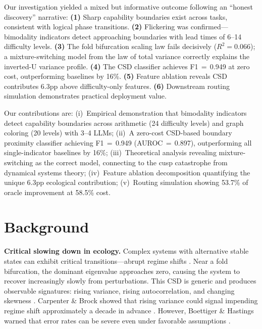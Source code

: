 \documentclass[11pt,letterpaper]{article}
\begin{document}
Our investigation yielded a mixed but informative outcome following an ``honest discovery'' narrative: \textbf{(1)} Sharp capability boundaries exist across tasks, consistent with logical phase transitions. \textbf{(2)} Flickering was confirmed---bimodality indicators detect approaching boundaries with lead times of 6--14 difficulty levels. \textbf{(3)} The fold bifurcation scaling law fails decisively ($R^2{=}0.066$); a mixture-switching model from the law of total variance correctly explains the inverted-U variance profile. \textbf{(4)} The CSD classifier achieves F1$\,{=}\,$0.949 at zero cost, outperforming baselines by 16\%. \textbf{(5)} Feature ablation reveals CSD contributes 6.3pp above difficulty-only features. \textbf{(6)} Downstream routing simulation demonstrates practical deployment value.

Our contributions are: (i)~Empirical demonstration that bimodality indicators detect capability boundaries across arithmetic (24 difficulty levels) and graph coloring (20 levels) with 3--4 LLMs; (ii)~A zero-cost CSD-based boundary proximity classifier achieving F1$\,{=}\,$0.949 (AUROC$\,{=}\,$0.897), outperforming all single-indicator baselines by 16\%; (iii)~Theoretical analysis revealing mixture-switching as the correct model, connecting to the cusp catastrophe from dynamical systems theory; (iv)~Feature ablation decomposition quantifying the unique 6.3pp ecological contribution; (v)~Routing simulation showing 53.7\% of oracle improvement at 58.5\% cost.

\section{Background}
\label{sec:background}

\textbf{Critical slowing down in ecology.} Complex systems with alternative stable states can exhibit critical transitions---abrupt regime shifts \cite{scheffer2009}. Near a fold bifurcation, the dominant eigenvalue approaches zero, causing the system to recover increasingly slowly from perturbations. This CSD is generic and produces observable signatures: rising variance, rising autocorrelation, and changing skewness \cite{dakos2012methods, carpenter2006}. Carpenter \& Brock showed that rising variance could signal impending regime shift approximately a decade in advance \cite{carpenter2006}. However, Boettiger \& Hastings warned that error rates can be severe even under favorable assumptions \cite{boettiger2012}.
\end{document}
